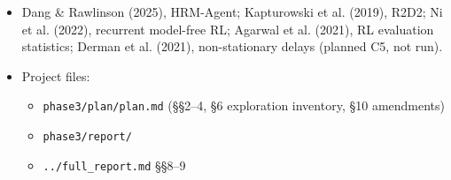 \documentclass[11pt]{article}
\begin{document}
\begin{itemize}
\item Dang \& Rawlinson (2025), HRM-Agent; Kapturowski et al. (2019), R2D2; Ni et al. (2022), recurrent model-free RL; Agarwal et al. (2021), RL evaluation statistics; Derman et al. (2021), non-stationary delays (planned C5, not run).
\item Project files:
\begin{itemize}
\item \texttt{phase3/\allowbreak{}plan/\allowbreak{}plan.\allowbreak{}md} (\S{}\S{}2--4, \S{}6 exploration inventory, \S{}10 amendments)
\item \texttt{phase3/\allowbreak{}report/\allowbreak{}}
\item \texttt{.\allowbreak{}.\allowbreak{}/\allowbreak{}full\_\allowbreak{}report.\allowbreak{}md} \S{}\S{}8--9
\end{itemize}
\end{itemize}
\end{document}
